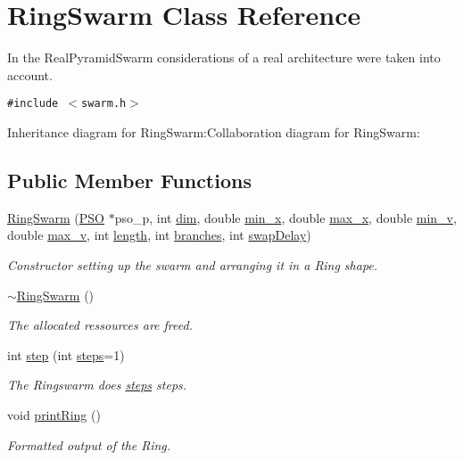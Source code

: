 \hypertarget{classRingSwarm}{
\section{RingSwarm Class Reference}
\label{classRingSwarm}
}
In the RealPyramidSwarm considerations of a real architecture were taken into account.  


{\tt \#include $<$swarm.h$>$}

Inheritance diagram for RingSwarm:Collaboration diagram for RingSwarm:\subsection*{Public Member Functions}
\begin{CompactItemize}
\item 
\hyperlink{classRingSwarm_61b676fb64dbfd3888d0f1b714a9c188}{RingSwarm} (\hyperlink{classPSO}{PSO} $\ast$pso\_\-p, int \hyperlink{runpso_8cpp_70b5e28b5bc3d1b63a7435c5fe50b837}{dim}, double \hyperlink{classSwarm_b504e23c39413573e3685a88435f5f85}{min\_\-x}, double \hyperlink{classSwarm_e5075d21be96c1cdf441bc2b612177c1}{max\_\-x}, double \hyperlink{classSwarm_160c79397ea811636e17c0e4d6297729}{min\_\-v}, double \hyperlink{classSwarm_2b0dbde2c275f991580a07a745cb5ade}{max\_\-v}, int \hyperlink{classRingSwarm_ab4a1218eb2ea7858a4172370f5b51b4}{length}, int \hyperlink{classRingSwarm_f187d6157f05bba9d56617e47afcd11c}{branches}, int \hyperlink{classRingSwarm_bc6194060dcd54ddfa56ec3b56b15515}{swapDelay})
\begin{CompactList}\small\item\em Constructor setting up the swarm and arranging it in a Ring shape. \item\end{CompactList}\item 
\hyperlink{classRingSwarm_f498eeaf52d1053a4817b39413b77a48}{$\sim$RingSwarm} ()
\begin{CompactList}\small\item\em The allocated ressources are freed. \item\end{CompactList}\item 
int \hyperlink{classRingSwarm_a5441ba339db7fc269f4784917189eab}{step} (int \hyperlink{runpso_8cpp_b4ae7205573977222eadd0795db193e2}{steps}=1)
\begin{CompactList}\small\item\em The Ringswarm does \hyperlink{runpso_8cpp_b4ae7205573977222eadd0795db193e2}{steps} steps. \item\end{CompactList}\item 
void \hyperlink{classRingSwarm_747de173be4727e03eb584290f4d31d0}{printRing} ()
\begin{CompactList}\small\item\em Formatted output of the Ring. \item\end{CompactList}\end{CompactItemize}
